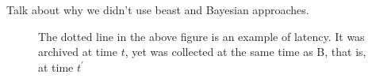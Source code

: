 Talk about why we didn't use beast and Bayesian approaches. 

\begin{figure} \label{fig:latenttree}
	\centering
	\scalebox{5}{}
	\caption[Example of latent behavior]{The dotted line in the above figure is an example of latency. It was archived at time $t$, yet was collected at the same time as B, that is, at time $t^\prime$}
\end{figure}
